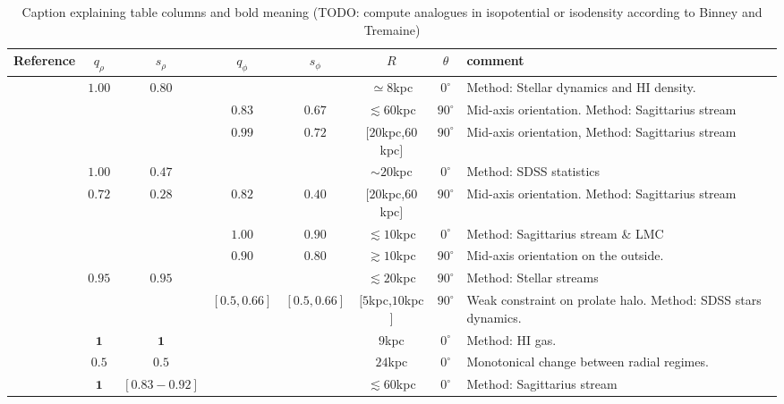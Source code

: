 \documentclass[a4paper,fleqn,usenatbib]{mnras}
\begin{document}
\begin{table}
\begin{tabular}{|l|cc|cc|c|c|p{4cm}|}\hline
Reference&$q_{\rho}$&$s_{\rho}$&$q_{\phi}$&$s_{\phi}$&$R$&$\theta$&comment\\ \hline \hline
\citet{Olling_and_Merrifield_2000}& $\mathbf{1.00}$ & $\mathbf{0.80}$ & & & $\simeq 8$kpc & $0^{\circ}$&Method: Stellar dynamics and HI density. \\\hline
\citet{Law_and_Majewski_2009}&&&$\mathbf{0.83}$&$\mathbf{0.67}$& $\lesssim 60$kpc&$90^{\circ}$&Mid-axis orientation. Method: Sagittarius stream\\\hline
%
\citet{Law_and_Majewski_2010}&&&$\mathbf{0.99}$&$\mathbf{0.72}$& $[20$kpc,$60$kpc$]$&$90^{\circ}$&Mid-axis orientation, Method: Sagittarius stream\\\hline
%
\citet{Loebman_et_al._2012}&$\mathbf{1.00}$&$\mathbf{0.47}$&&&$\sim 20$kpc &$0^{\circ}$&Method: SDSS statistics\\\hline
%
\citet{Deg_and_Widrow_2013}&$0.72$&$0.28$&$0.82$&$0.40$&$[20$kpc,$60$kpc$]$&$90^{\circ}$& Mid-axis orientation. Method: Sagittarius stream\\\hline
%
\multirow{2}{*}{\citet{Vera-Ciro_and_Helmi_2013}}&&&$\mathbf{1.00}$&$\mathbf{0.90}$&$\lesssim 10$kpc&$0^{\circ}$ & Method: Sagittarius stream \& LMC \\
&&&$\mathbf{0.90}$&$\mathbf{0.80}$&$\gtrsim 10$kpc&$90^{\circ}$& Mid-axis orientation on the outside. \\\hline
%
\citet{Bovy_et_el._2016}&$\mathbf{0.95}$&$\mathbf{0.95}$&&&$\lesssim 20$kpc&$90^{\circ}$ & Method: Stellar streams\\\hline
%
\citet{Bowden_et_al._2016}&&&$\mathbf{[0.5,0.66]}$&$\mathbf{[0.5,0.66]}$&$[5$kpc,$10$kpc$]$&$90^{\circ}$& Weak constraint on prolate halo. Method: SDSS stars dynamics.\\\hline
%
\multirow{2}{*}{\citet{Banerjee_and_Chanda_2011}}&$\mathbf{1}$&$\mathbf{1}$&&&$9$kpc&$0^{\circ}$&Method: HI gas. \\
&$\mathbf{0.5}$&$\mathbf{0.5}$&&&$24$kpc&$0^{\circ}$&Monotonical change between radial regimes.\\\hline
%
\cite{Johnston_et_al._2005}&$\mathbf{1}$&$\mathbf{[0.83-0.92]}$&&&$\lesssim 60$kpc&$0^{\circ}$&Method: Sagittarius stream\\\hline\hline
\end{tabular}
\caption{Caption explaining table columns and bold meaning (TODO: compute analogues in isopotential or isodensity according to Binney and Tremaine)}
\end{table}
\end{document}
